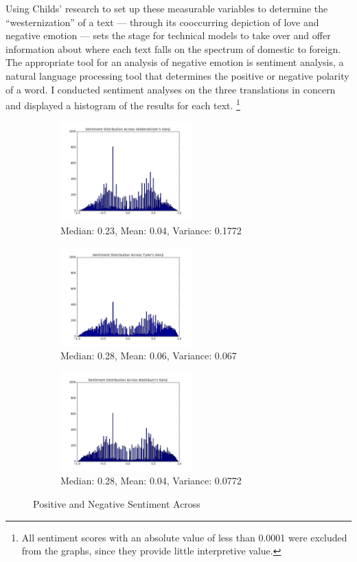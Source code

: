 \documentclass[12pt]{article}
\begin{document}
\begin{flushleft}
\begin{spacing}{2.0}
Using Childs' research to set up these measurable variables to determine the ``westernization'' of a text --- through its cooccurring depiction of love and negative emotion --- sets the stage for technical models to take over and offer information about where each text falls on the spectrum of domestic to foreign. The appropriate tool for an analysis of negative emotion is sentiment analysis, a natural language processing tool that determines the positive or negative polarity of a word. I conducted sentiment analyses on the three translations in concern and displayed a histogram of the results for each text. \footnote{All sentiment scores with an absolute value of less than 0.0001 were excluded from the graphs, since they provide little interpretive value.}

\begin{figure}
	\begin{subfigure}{.3\linewidth}
		\includegraphics[width=2in]{seidensticker-sentiment.png}\hfill
		\caption{\scriptsize Median: 0.23, Mean: 0.04, Variance: 0.1772}
	\end{subfigure}
	\begin{subfigure}{.3\linewidth}
		\includegraphics[width=2in]{tyler-sentiment.png}\hfill
		\caption{\scriptsize Median: 0.28, Mean: 0.06, Variance: 0.067}		
	\end{subfigure}
	\begin{subfigure}{.3\linewidth}
		\includegraphics[width=2in]{washburn-sentiment.png}
		\caption{\scriptsize Median: 0.28, Mean: 0.04, Variance: 0.0772}
	\end{subfigure}
    \caption{Positive and Negative Sentiment Across }
    \label{sentiment-hists}
\end{figure}


\end{spacing}
\end{flushleft}
\end{document}
